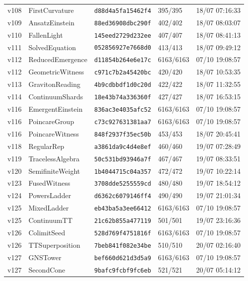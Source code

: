 \documentclass[11pt]{article}
\theoremstyle{definition}\newtheorem{deriv}{Derivação}
\begin{document}
{\begin{longtable}{@{}lllll@{}}
v108 & FirstCurvature & \texttt{d88d4a5fa15462f4} & 395/395 & 18/07 07:16:33 \\
v109 & AnsatzEinstein & \texttt{88ed36908dbc290f} & 402/402 & 18/07 08:03:07 \\
v110 & FallenLight & \texttt{145eed2729d232ee} & 407/407 & 18/07 08:41:13 \\
v111 & SolvedEquation & \texttt{052856927e7668d0} & 413/413 & 18/07 09:49:12 \\
v112 & ReducedEmergence & \texttt{d11854b264e6e17c} & 6163/6163 & 07/10 19:08:57 \\
v112 & GeometricWitness & \texttt{c971c7b2a45420bc} & 420/420 & 18/07 10:53:35 \\
v113 & GravitonReading & \texttt{4b9cdbbdf1d0c20d} & 422/422 & 18/07 11:32:55 \\
v114 & ContinuumShards & \texttt{18e43b74a336360f} & 427/427 & 18/07 16:53:15 \\
v116 & EmergentEinstein & \texttt{836ac3e4035afc52} & 6163/6163 & 07/10 19:08:57 \\
v116 & PoincareGroup & \texttt{c73c927631381aa7} & 6163/6163 & 07/10 19:08:57 \\
v116 & PoincareWitness & \texttt{848f2937f35ec50b} & 453/453 & 18/07 20:45:41 \\
v118 & RegularRep & \texttt{a3861da9c4d4e8ef} & 460/460 & 19/07 07:28:49 \\
v119 & TracelessAlgebra & \texttt{50c531bd93946a7f} & 467/467 & 19/07 08:33:51 \\
v120 & SemifiniteWeight & \texttt{1b4044715c04a357} & 472/472 & 19/07 10:22:14 \\
v123 & FusedWitness & \texttt{3708dde5255559cd} & 480/480 & 19/07 18:54:12 \\
v124 & PowersLadder & \texttt{d6362c6079146ff4} & 490/490 & 19/07 21:01:34 \\
v125 & MixedLadder & \texttt{eb43ba5a3ee66412} & 6163/6163 & 07/10 19:08:57 \\
v125 & ContinuumTT & \texttt{21c62b855a477119} & 501/501 & 19/07 23:16:36 \\
v126 & ColimitSeed & \texttt{528d769f4751816f} & 6163/6163 & 07/10 19:08:57 \\
v126 & TTSuperposition & \texttt{7beb841f082e34be} & 510/510 & 20/07 02:16:40 \\
v127 & GNSTower & \texttt{bef660d621d3d5a9} & 6163/6163 & 07/10 19:08:57 \\
v127 & SecondCone & \texttt{9bafc9fcbf9fc6eb} & 521/521 & 20/07 05:14:12 \\

\end{longtable}}
\end{document}

